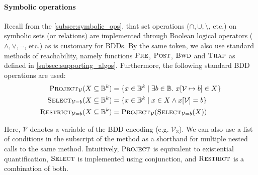 

\paragraph{Symbolic operations} Recall from the \autoref{subsec:symbolic_ops}, that set operations ($\cap, \cup, \setminus$, etc.) on symbolic sets (or relations) are implemented through Boolean logical operators ($\land, \lor, \neg$, etc.) as is customary for BDDs. By the same token, we also use standard methods of reachability, namely functions $\textsc{Pre}$, $\textsc{Post}$, $\textsc{Bwd}$ and $\textsc{Trap}$ as defined in \autoref{subsec:supporting_algos}. Furthermore, the following standard BDD operations are used:
\begin{align*}
	\textsc{Project}_{\mathcal{V}}(X \subseteq \mathbb{B}^k)&= \{ x \in \mathbb{B}^k \mid \exists b \in \mathbb{B}.~x[\mathcal{V} \mapsto b] \in X \}\\
	\textsc{Select}_{\mathcal{V}=b}(X \subseteq \mathbb{B}^k)&= \{ x \in \mathbb{B}^k \mid x \in X \land x[\mathcal{V}] = b \}\\	
	\textsc{Restrict}_{\mathcal{V}=b}(X \subseteq \mathbb{B}^k)&=\textsc{Project}_{\mathcal{V}}(\textsc{Select}_{\mathcal{V}=b}(X))
\end{align*}

Here, $\mathcal{V}$ denotes a variable of the BDD encoding (e.g. $\mathcal{V}_3$). We can also use a list of conditions in the subscript of the method as a shorthand for multiple nested calls to the same method. Intuitively, $\textsc{Project}$ is equivalent to existential quantification, $\textsc{Select}$ is implemented using conjunction, and $\textsc{Restrict}$ is a combination of both. 


